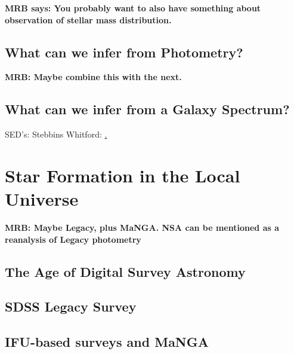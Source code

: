 {\bf MRB says: You probably want to also have something
about observation of stellar mass distribution.}

\subsection{What can we infer from Photometry?}

{\bf MRB: Maybe combine this with the next.}

\subsection{What can we infer from a Galaxy Spectrum?}

SED's: Stebbins Whitford: \href{http://adsabs.harvard.edu/abs/1968ApJ...154...21O}.

\section{Star Formation in the Local Universe}

{\bf MRB: Maybe Legacy, plus MaNGA. NSA can be mentioned
as a reanalysis of Legacy photometry}

\subsection{The Age of Digital Survey Astronomy}

\subsection{SDSS Legacy Survey}

\subsection{IFU-based surveys and MaNGA}

\section{}



